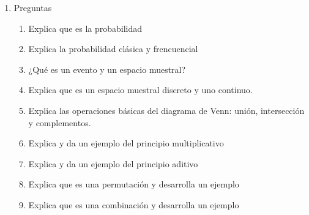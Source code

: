 \documentclass[12pt,letterpaper]{report}
\begin{document}
	 \begin{enumerate}
	 \item Preguntas
	 		\begin{enumerate}
	 			\item Explica que es la probabilidad
	 			\item Explica la probabilidad clásica y frencuencial
	 			\item ¿Qué es un evento y un  espacio muestral?
	 			\item Explica que es un espacio muestral discreto y uno continuo.
	 			\item Explica las operaciones básicas del diagrama de Venn: unión, intersección y complementos.
	 			\item Explica y da un ejemplo del principio multiplicativo
	 			\item Explica y da un ejemplo del principio aditivo
	 			\item Explica que es una permutación y desarrolla un ejemplo
	 			\item Explica que es una combinación y desarrolla un ejemplo
	 		\end{enumerate}


\end{enumerate}
\end{document}

